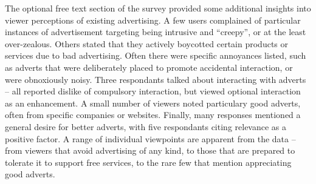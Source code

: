 The optional free text section of the survey provided some additional insights into viewer perceptions of existing advertising.
A few users complained of particular instances of advertisement targeting being intrusive and ``creepy'', or at the least over-zealous. 
Others stated that they actively boycotted certain products or services due to bad advertising.
Often there were specific annoyances listed, such as adverts that were deliberately placed to promote accidental interaction, or were obnoxiously noisy.
Three respondants talked about interacting with adverts -- all reported dislike of compulsory interaction, but viewed optional interaction as an enhancement.
A small number of viewers noted particulary good adverts, often from specific companies or websites. 
Finally, many responses mentioned a general desire for better adverts, with five respondants citing relevance as a positive factor.
A range of individual viewpoints are apparent from the data -- from viewers that avoid advertising of any kind, to those that are prepared to tolerate it to support free services, to the rare few that mention appreciating good adverts.


